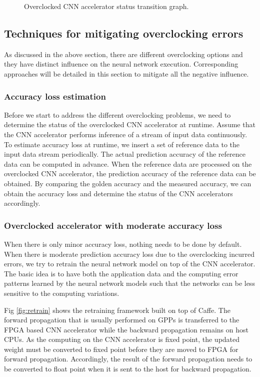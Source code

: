 \begin{figure}
    \caption{Overclocked CNN accelerator status transition graph.}
\label{fig:loss-estimation}
\vspace{-1em}
\end{figure}


\subsection{Techniques for mitigating overclocking errors}
As discussed in the above section, there are different overclocking options and 
they have distinct influence on the neural network execution. Corresponding approaches 
will be detailed in this section to mitigate all the negative influence.

\subsubsection{Accuracy loss estimation}
Before we start to address the different overclocking problems, we need to 
determine the status of the overclocked CNN accelerator at runtime. 
Assume that the CNN accelerator performs inference of a stream of input data continuously.
To estimate accuracy loss at runtime, we insert a set of reference data to the 
input data stream periodically. The actual prediction 
accuracy of the reference data can be computed in advance. When the 
reference data are processed on the overclocked CNN accelerator, the 
prediction accuracy of the reference data can be obtained. By comparing the 
golden accuracy and the measured accuracy, we can obtain the accuracy loss and 
determine the status of the CNN accelerators accordingly.

\subsubsection{Overclocked accelerator with moderate accuracy loss}
When there is only minor accuracy loss, nothing needs to be done by default.
When there is moderate prediction accuracy loss due to the overclocking incurred errors, 
we try to retrain the neural network model on top of the CNN accelerator. 
The basic idea is to have both the application data and the computing error 
patterns learned by the neural network models such that the networks 
can be less sensitive to the computing variations. 

Fig \ref{fig:retrain} shows the retraining framework built on top of Caffe.
The forward propagation that is usually performed on GPPs is transferred to 
the FPGA based CNN accelerator while the backward propagation remains on 
host CPUs. As the computing on the CNN accelerator is fixed point, the updated 
weight must be converted to fixed point before they are moved to FPGA 
for forward propagation. Accordingly, the result of the forward propagation 
needs to be converted to float point when it is sent to the host for backward 
propagation.

